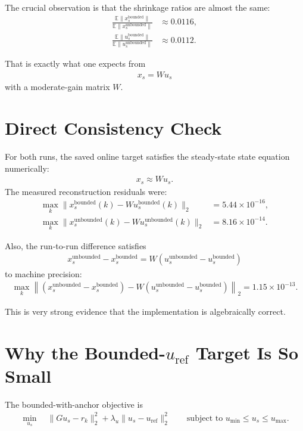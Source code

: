 \documentclass[11pt]{article}
\begin{document}
The crucial observation is that the shrinkage ratios are almost the same:
\begin{align}
\frac{\mathbb{E}\|x_s^{\mathrm{bounded}}\|}{\mathbb{E}\|x_s^{\mathrm{unbounded}}\|} &\approx 0.0116, \\
\frac{\mathbb{E}\|u_s^{\mathrm{bounded}}\|}{\mathbb{E}\|u_s^{\mathrm{unbounded}}\|} &\approx 0.0112.
\end{align}

That is exactly what one expects from
\begin{align}
x_s = Wu_s
\end{align}
with a moderate-gain matrix $W$.

\section{Direct Consistency Check}

For both runs, the saved online target satisfies the steady-state state equation numerically:
\begin{align}
x_s \approx Wu_s.
\end{align}
The measured reconstruction residuals were:
\begin{align}
\max_k \|x_s^{\mathrm{bounded}}(k) - W u_s^{\mathrm{bounded}}(k)\|_2
&= 5.44\times 10^{-16}, \\
\max_k \|x_s^{\mathrm{unbounded}}(k) - W u_s^{\mathrm{unbounded}}(k)\|_2
&= 8.16\times 10^{-14}.
\end{align}

Also, the run-to-run difference satisfies
\begin{align}
x_s^{\mathrm{unbounded}} - x_s^{\mathrm{bounded}}
=
W\left(u_s^{\mathrm{unbounded}} - u_s^{\mathrm{bounded}}\right)
\end{align}
to machine precision:
\begin{align}
\max_k
\left\|
\left(x_s^{\mathrm{unbounded}} - x_s^{\mathrm{bounded}}\right)
- W\left(u_s^{\mathrm{unbounded}} - u_s^{\mathrm{bounded}}\right)
\right\|_2
=
1.15\times 10^{-13}.
\end{align}

This is very strong evidence that the implementation is algebraically correct.

\section{Why the Bounded-\texorpdfstring{$u_{\mathrm{ref}}$}{u\_ref} Target Is So Small}

The bounded-with-anchor objective is
\begin{align}
\min_{u_s}
\quad
\|Gu_s-r_k\|_2^2 + \lambda_u \|u_s-u_{\mathrm{ref}}\|_2^2
\qquad
\text{subject to }
u_{\min} \le u_s \le u_{\max}.
\end{align}
\end{document}
